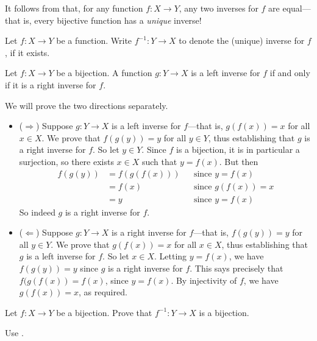 It follows from  that, for any function $f : X \to Y$, any two inverses for $f$ are equal---that is, every bijective function has a \textit{unique} inverse!

\begin{notation}
Let $f : X \to Y$ be a function. Write $f^{-1} : Y \to X$ to denote the (unique) inverse for $f$, if it exists.
\end{notation}

\begin{proposition}
Let $f : X \to Y$ be a bijection. A function $g : Y \to X$ is a left inverse for $f$ if and only if it is a right inverse for $f$.
\end{proposition}

\begin{cproof}
We will prove the two directions separately.
\begin{itemize}
\item ($\Rightarrow$) Suppose $g : Y \to X$ is a left inverse for $f$---that is, $g(f(x))=x$ for all $x \in X$. We prove that $f(g(y))=y$ for all $y \in Y$, thus establishing that $g$ is a right inverse for $f$. So let $y \in Y$. Since $f$ is a bijection, it is in particular a surjection, so there exists $x \in X$ such that $y=f(x)$. But then
\begin{align*}
f(g(y)) &= f(g(f(x))) && \text{since $y=f(x)$} \\
&= f(x) && \text{since $g(f(x))=x$} \\
&= y && \text{since $y=f(x)$}
\end{align*}
So indeed $g$ is a right inverse for $f$.
\item ($\Leftarrow$) Suppose $g : Y \to X$ is a right inverse for $f$---that is, $f(g(y))=y$ for all $y \in Y$. We prove that $g(f(x))=x$ for all $x \in X$, thus establishing that $g$ is a left inverse for $f$. So let $x \in X$. Letting $y = f(x)$, we have $f(g(y)) = y$ since $g$ is a right inverse for $f$. This says precisely that $f(g(f(x)) = f(x)$, since $y=f(x)$. By injectivity of $f$, we have $g(f(x))=x$, as required.
\end{itemize}
\end{cproof}

\begin{exercise}
\label{exInverseBijection}
Let $f : X \to Y$ be a bijection. Prove that $f^{-1} : Y \to X$ is a bijection.
\begin{backhint}
Use .
\end{backhint}
\end{exercise}

